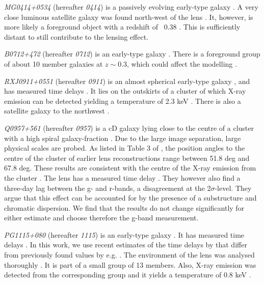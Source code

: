 \documentclass[useAMS,usenatbib]{mn2e}
\begin{document}
\textit{MG0414+0534} (hereafter \textit{0414}) is a passively evolving early-type galaxy \citep{1999AJ....117.2034T}. A very close luminous satellite galaxy was found north-west of the lens \citep{1993AJ....105....1S}. It, however, is more likely a foreground object with a redshift of ~0.38 \citep{2011MNRAS.413L..86C}. This is sufficiently distant to still contribute to the lensing effect.

\textit{B0712+472} (hereafter \textit{0712}) is an early-type galaxy \citep{1998MNRAS.296..483J,1998AJ....115..377F}. There is a foreground group of about 10 member galaxies at $z\sim0.3$, which could affect the modelling \citep{2002AJ....123..627F}.

\textit{RXJ0911+0551} (hereafter \textit{0911}) is an almost spherical early-type galaxy \citep{1997A&A...317L..13B,2012A&A...538A..99S}, and has measured time delays \citep{2002ApJ...572L..11H}. It lies on the outskirts of a cluster of which X-ray emission can be detected yielding a temperature of 2.3 keV \citep{2001ApJ...555....1M}. There is also a satellite galaxy to the northwest \citep{2000ApJ...544L..35K}.

\textit{Q0957+561} (hereafter \textit{0957}) is a cD galaxy lying close to the centre of a cluster with a high spiral galaxy-fraction \citep[e.g.][]{1992MNRAS.254P..27G,1994A&A...291..411A,1998ApJ...504..661C}. Due to the large image separation, large physical scales are probed. As listed in Table 3 of \cite{2000ApJ...542...74K}, the position angles to the centre of the cluster of earlier lens reconstructions range between 51.8 deg and 67.8 deg. These results are consistent with the centre of the X-ray emission from the cluster \citep{1998ApJ...504..661C}. The lens has a measured time delay \citep[e.g.][]{2012A&A...540A.132S}. They however also find a three-day lag between the g- and r-bands, a disagreement at the 2$\sigma$-level. They argue that this effect can be accounted for by the presence of a substructure and chromatic dispersion. We find that the results do not change significantly for either estimate and choose therefore the g-band measurement.

\textit{PG1115+080} (hereafter \textit{1115}) is an early-type galaxy \citep{1980Natur.285..641W,2005ApJ...626...51Y}. It has measured time delays \citep[see e.g.][]{1997ApJ...475L..85S}. In this work, we use recent estimates of the time delays by \cite{2010MNRAS.406.2764T} that differ from previously found values by e.g. \cite{1997ApJ...489...21B}. The environment of the lens was analysed thoroughly \citep{2006ApJ...641..169M,2011ApJ...726...84W}. It is part of a small group of 13 members. Also, X-ray emission was detected from the corresponding group and it yields a temperature of 0.8 keV \citep{2004ApJ...610..686G}.
\end{document}
